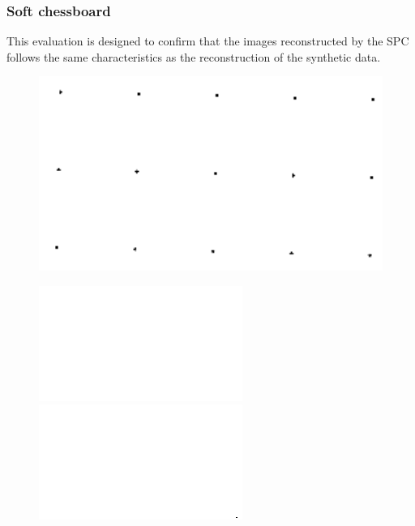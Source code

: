 \subsubsection{Soft chessboard}
This evaluation is designed to confirm that the images reconstructed by the SPC follows the same characteristics as the reconstruction of the synthetic data.


\begin{figure}[H]
    \centering
\begin{minipage}[h]{0.3\textwidth}
	\vspace*{1cm}
    \includegraphics[width=1\textwidth]{result/hom/im_ref.png}
    \label{fig:hom_ref}
\end{minipage}
\begin{minipage}[t]{0.22\textwidth}
    \includegraphics[width = \textwidth]{result/hom/im_m5.png}
    \label{fig:hom_5}
    \includegraphics[width = \textwidth]{result/hom/im_m20.png}

\end{minipage}
\end{figure}
